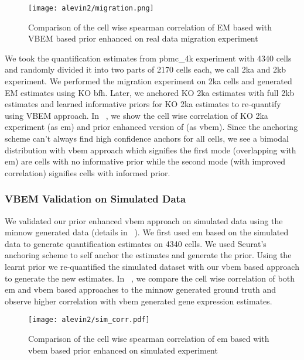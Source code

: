   \begin{figure}[!htb]
      \centering
    \texttt{[image: alevin2/migration.png]}
    \caption{ Comparison of the cell wise spearman correlation of EM based \alevin with VBEM based
	prior enhanced \alevin on real data migration experiment}
    \label{fig:alv2_real_val}
  \end{figure}

We took the quantification estimates from pbmc\_4k experiment with 4340 cells and randomly divided it into
two parts of 2170 cells each, we call 2ka and 2kb experiment. We performed the migration experiment on
2ka cells and generated \alevin EM estimates using KO bfh. Later, we anchored KO 2ka estimates 
with full 2kb estimates and learned informative priors for KO 2ka estimates to re-quantify using \alevin VBEM
approach. In ~, we show the cell wise correlation of KO 2ka experiment (as em) and prior
enhanced version of \alevin (as vbem). Since the anchoring scheme can't always find high confidence anchors for 
all cells, we see a bimodal distribution with vbem approach which signifies the first mode (overlapping 
with em) are cells with no informative prior while the second mode (with improved correlation)
signifies cells with informed prior.

\subsubsection{VBEM Validation on Simulated Data}
We validated our prior enhanced vbem approach on simulated data using the minnow generated data (details in
~). We first used em based \alevin on the simulated data to generate quantification
estimates on 4340 cells. We used Seurat's anchoring scheme to self anchor the estimates and generate the
prior. Using the learnt prior we re-quantified the simulated dataset with our vbem based approach to generate 
the new estimates. In ~, we compare the cell wise correlation of both em and vbem
based approaches to the minnow generated ground truth and observe higher correlation with vbem generated
gene expression estimates.

  \begin{figure}[!htb]
      \centering
    \texttt{[image: alevin2/sim\_corr.pdf]}
    \caption{ Comparison of the cell wise spearman correlation of em based \alevin with vbem based
	prior enhanced \alevin on simulated experiment}
    \label{fig:alv2_sim_val}
  \end{figure}

